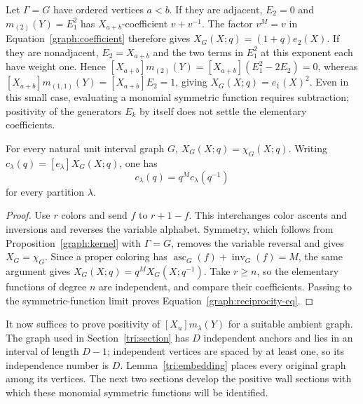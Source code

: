\begin{example}
Let $\Gamma=G$ have ordered vertices $a<b$. If they are adjacent,
$E_2=0$ and $m_{(2)}(Y)=E_1^2$ has $X_{a+b}$-coefficient
$v+v^{-1}$. The factor $v^M=v$ in
Equation~\eqref{graph:coefficient} therefore gives
$X_G(X;q)=(1+q)e_2(X)$.
If they are nonadjacent, $E_2=X_{a+b}$ and the two terms in
$E_1^2$ at this exponent each have weight one. Hence
$[X_{a+b}]m_{(2)}(Y)=[X_{a+b}](E_1^2-2E_2)=0$, whereas
$[X_{a+b}]m_{(1,1)}(Y)=[X_{a+b}]E_2=1$, giving
$X_G(X;q)=e_1(X)^2$. Even in this small case, evaluating a monomial
symmetric function requires subtraction; positivity of the generators
$E_k$ by itself does not settle the elementary coefficients.
\end{example}

\begin{lemma}
\label{graph:reciprocity}
For every natural unit interval graph $G$, $X_G(X;q)=\chi_G(X;q)$.
Writing $c_\lambda(q)=[e_\lambda]X_G(X;q)$, one has
\begin{equation}
 c_\lambda(q)=q^M c_\lambda(q^{-1})
 \label{graph:reciprocity-eq}
\end{equation}
for every partition $\lambda$.
\end{lemma}

\begin{proof}
Use $r$ colors and send $f$ to $r+1-f$. This interchanges color
ascents and inversions and reverses the variable alphabet. Symmetry,
which follows from Proposition~\ref{graph:kernel} with
$\Gamma=G$, removes the variable reversal and gives
$X_G=\chi_G$. Since a proper coloring has
$\operatorname{asc}_G(f)+\operatorname{inv}_G(f)=M$, the same
argument gives $X_G(X;q)=q^M X_G(X;q^{-1})$. Take $r\ge n$, so
the elementary functions of degree $n$ are independent, and compare
their coefficients. Passing to the symmetric-function limit proves
Equation~\eqref{graph:reciprocity-eq}.
\end{proof}

It now suffices to prove positivity of
$[X_u]m_\lambda(Y)$ for a suitable ambient graph. The graph used in
Section~\ref{tri:section} has $D$ independent anchors and lies in an
interval of length $D-1$; independent vertices are spaced by at least
one, so its independence number is $D$.
Lemma~\ref{tri:embedding} places every original graph among its
vertices. The next two sections develop the positive wall sections
with which these monomial symmetric functions will be identified.
